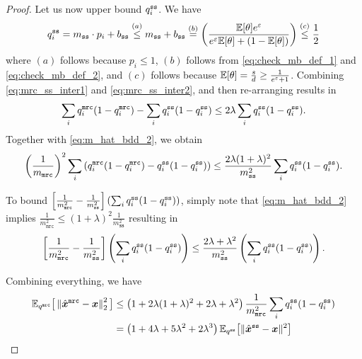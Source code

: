 \begin{proof}
Let us now upper bound $q^{\texttt{ss}}_i$. We have 
\begin{align}
    q^{\texttt{ss}}_i  = m_\texttt{ss} \cdot p_i +
b_\texttt{ss} \stackrel{(a)}{\leq} m_\texttt{ss} + b_\texttt{ss} \stackrel{(b)}{=} \left( \frac{\mathbb{E}[\theta]e^\varepsilon}{e^\varepsilon \mathbb{E}[\theta]+(1-\mathbb{E}[\theta])}\right)  \stackrel{(c)}{\leq} \frac{1}{2} \label{eq:mrc_ss_inter2}
\end{align}
where $(a)$ follows because $p_i \leq 1$, $(b)$ follows from \eqref{eq:check_mb_def_1} and \eqref{eq:check_mb_def_2}, and $(c)$ follows because $\mathbb{E}[\theta] = \frac{s}{d} \geq \frac{1}{e^\varepsilon+ 1}$. Combining \eqref{eq:mrc_ss_inter1} and \eqref{eq:mrc_ss_inter2}, and then re-arranging results in
$$ \sum_i q^{\texttt{mrc}}_i(1-q^{\texttt{mrc}}_i) - \sum_i q^{\texttt{ss}}_i(1-q^{\texttt{ss}}_i)\leq 2\lambda \sum_i q^{\texttt{ss}}_i(1-q^{\texttt{ss}}_i). $$
Together with \eqref{eq:m_hat_bdd_2}, we obtain
$$ \left(\frac{1}{m_\texttt{mrc}}\right)^2\sum_{i}\left( q^{\texttt{mrc}}_i (1-q^{\texttt{mrc}}_i) - q^{\texttt{ss}}_i (1-q^{\texttt{ss}}_i) \right) \leq  \frac{2\lambda(1+\lambda)^2}{m_\texttt{ss}^2}\sum_i q^{\texttt{ss}}_i(1-q^{\texttt{ss}}_i).$$


To bound $\left[ \frac{1}{m_\texttt{mrc}^2}-\frac{1}{m_\texttt{ss}^2}\right]\left( \sum_i q^{\texttt{ss}}_i (1-q^{\texttt{ss}}_i) \right)$, simply note that \eqref{eq:m_hat_bdd_2} implies $\frac{1}{m_\texttt{mrc}^2} \leq (1+\lambda)^2\frac{1}{m_{\texttt{ss}}^2}$ resulting in
$$\left[ \frac{1}{m_\texttt{mrc}^2}-\frac{1}{m_\texttt{ss}^2}\right]\left( \sum_i q^{\texttt{ss}}_i (1-q^{\texttt{ss}}_i) \right) \leq \frac{2\lambda + \lambda^2}{m_\texttt{ss}^2} \left( \sum_i q^{\texttt{ss}}_i(1-q^{\texttt{ss}}_i) \right).$$

Combining everything, we have
\begin{align}
    \mathbb{E}_{q^{\texttt{mrc}}} \big[ \left\lVert  \hat{{\boldsymbol{x}}}^\texttt{mrc}    -     {\boldsymbol{x}} \right\rVert^2_2  \big]   & \leq    \left( 1+2\lambda(1+\lambda)^2 + 2\lambda + \lambda^2 \right)\frac{1}{m_\texttt{mrc}^2}\sum_i q^{\texttt{ss}}_i(1-q^{\texttt{ss}}_i)\\
    & =     \left( 1+4\lambda +5\lambda^2 + 2\lambda^3 \right)  \mathbb{E}_{q^{\texttt{ss}}}\big[\|\hat{{\boldsymbol{x}}}^{\texttt{ss}}    -    {\boldsymbol{x}}\|^2\big]
\end{align}
\end{proof}


